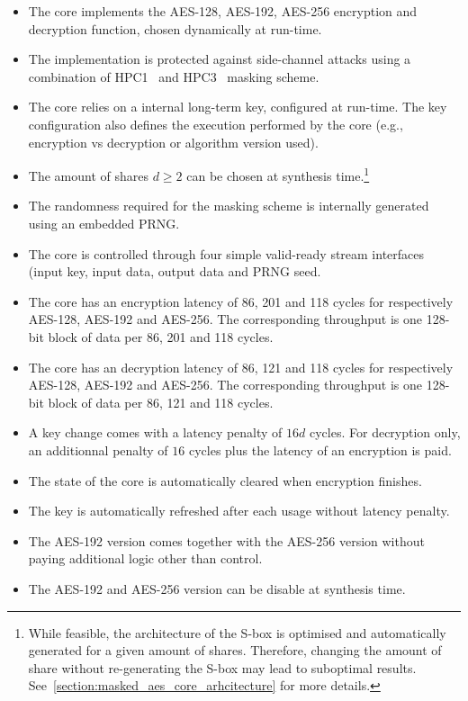 \documentclass{scrartcl}
\begin{document}
\begin{itemize}
\item{The core implements the AES-128, AES-192, AES-256 encryption and decryption function, chosen dynamically at run-time.}
\item{The implementation is protected against side-channel attacks using a combination of HPC1~\cite{DBLP:journals/tc/CassiersGLS21} and HPC3~\cite{DBLP:conf/ccs/Knichel022} masking scheme.}
\item{The core relies on a internal long-term key, configured at run-time. The key configuration also defines the execution performed by the core (e.g., encryption vs decryption or algorithm version used).}
\item{The amount of shares $d\ge 2$ can be chosen at synthesis time.\footnote{While feasible, the architecture of the S-box is optimised and automatically generated for a given amount of shares. Therefore, changing the amount of share without re-generating the S-box may lead to suboptimal results. See~\ref{section:masked_aes_core_arhcitecture} for more details.}}
\item{The randomness required for the masking scheme is internally generated using an embedded PRNG.}
\item{The core is controlled through four simple valid-ready stream interfaces (input key, input data, output data and PRNG seed.}
\item{The core has an encryption latency of 86, 201 and 118 cycles for respectively AES-128, AES-192 and AES-256. The corresponding throughput is one 128-bit block of data per 86, 201 and 118 cycles.}
\item{The core has an decryption latency of 86, 121 and 118 cycles for respectively AES-128, AES-192 and AES-256. The corresponding throughput is one 128-bit block of data per 86, 121 and 118 cycles.}
\item{A key change comes with a latency penalty of $16d$ cycles. For decryption only, an additionnal penalty of $16$ cycles plus the latency of an encryption is paid.}
\item{The state of the core is automatically cleared when encryption finishes.}
\item{The key is automatically refreshed after each usage without latency penalty.}
\item{The AES-192 version comes together with the AES-256 version without paying additional logic other than control.}
\item{The AES-192 and AES-256 version can be disable at synthesis time. }
\end{itemize}
\end{document}
